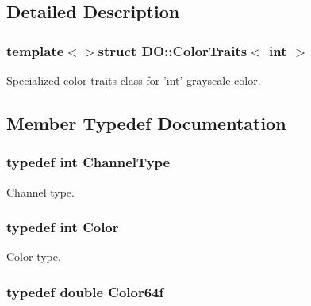 \subsection{Detailed Description}
\subsubsection*{template$<$$>$struct D\-O\-::\-Color\-Traits$<$ int $>$}

Specialized color traits class for 'int' grayscale color. 

\subsection{Member Typedef Documentation}
\hypertarget{struct_d_o_1_1_color_traits_3_01int_01_4_a793f06113f28e96ed56101c7a76ac681}{
\subsubsection[{Channel\-Type}]{\setlength{\rightskip}{0pt plus 5cm}typedef int {\bf Channel\-Type}}}\label{struct_d_o_1_1_color_traits_3_01int_01_4_a793f06113f28e96ed56101c7a76ac681}
Channel type. \hypertarget{struct_d_o_1_1_color_traits_3_01int_01_4_aeeff082dbf607675914ae4e2f81d6518}{
\subsubsection[{Color}]{\setlength{\rightskip}{0pt plus 5cm}typedef int {\bf Color}}}\label{struct_d_o_1_1_color_traits_3_01int_01_4_aeeff082dbf607675914ae4e2f81d6518}
\hyperlink{class_d_o_1_1_color}{Color} type. \hypertarget{struct_d_o_1_1_color_traits_3_01int_01_4_a9a301fd8ba0a7225e38351d3e5b2e4d3}{
\subsubsection[{Color64f}]{\setlength{\rightskip}{0pt plus 5cm}typedef double {\bf Color64f}}}\label{struct_d_o_1_1_color_traits_3_01int_01_4_a9a301fd8ba0a7225e38351d3e5b2e4d3}
